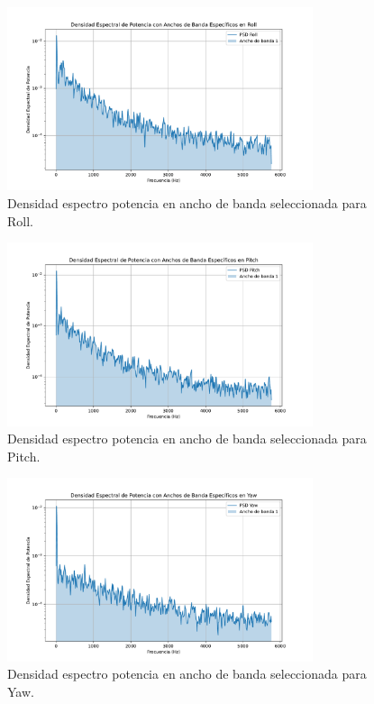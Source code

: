 \begin{figure}[H]
	\centering    
	\includegraphics[width=0.8\textwidth]{psd_roll.pdf}
	\caption{Densidad espectro potencia en ancho de banda seleccionada para Roll.}
	\label{fig:psd_roll}
\end{figure}	

\begin{figure}[H]
	\centering    
	\includegraphics[width=0.8\textwidth]{psd_pitch.pdf}
	\caption{Densidad espectro potencia en ancho de banda seleccionada para Pitch.}
	\label{fig:psd_pitch}
\end{figure}	

\begin{figure}[H]
	\centering    
	\includegraphics[width=0.8\textwidth]{psd_yaw.pdf}
	\caption{Densidad espectro potencia en ancho de banda seleccionada para Yaw.}
	\label{fig:psd_yaw}
\end{figure}	


